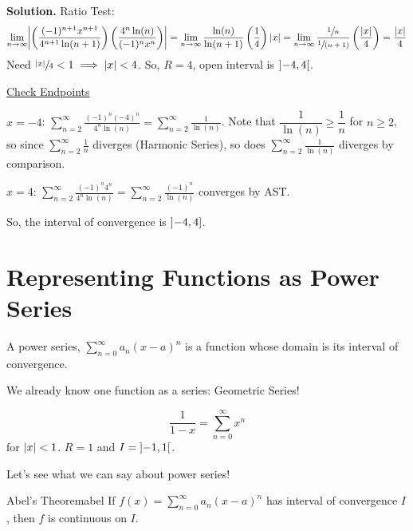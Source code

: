 \begin{Example}{}{}
\begin{enumerate}[label=(\roman*)]
              \textbf{Solution.} Ratio Test:
              \[ \lim\limits_{{n} \to {\infty}}
                  \abs*{\left( \frac{(-1)^{n+1}x^{n+1}}{4^{n+1}\ln(n+1)} \right)
                  \left( \frac{4^n\ln(n)}{(-1)^n x^n}  \right)}
                  =\lim\limits_{{n} \to {\infty}} \frac{\ln(n)}{\ln(n+1)} \left( \frac{1}{4} \right)
                  \abs{x}
                  =\lim\limits_{{n} \to {\infty}} \frac{\sfrac{1}{n}}{\sfrac{1}{(n+1)}}
                  \left( \frac{\abs{x}}{4} \right)
                  =\frac{\abs{x}}{4} \]
              Need $ \sfrac{\lvert x\rvert}{4}<1\implies \lvert x\rvert<4  $. So, $ R=4 $,
              open interval is $ \interval[open]{-4}{4} $.

              \underline{Check Endpoints}

              $ x=-4 $: $ \displaystyle \sum\limits_{n=2}^{\infty} \frac{(-1)^n(-4)^n}{4^n\ln(n)}
                  =\sum\limits_{n=2}^{\infty} \frac{1}{\ln(n)} $. Note that $ \dfrac{1}{\ln(n)}
                  \geqslant \dfrac{1}{n} $ for $ n\geqslant 2 $, so
              since $ \displaystyle \sum\limits_{n=2}^{\infty} \frac{1}{n} $ diverges (Harmonic Series), so does
              $ \displaystyle \sum\limits_{n=2}^{\infty} \frac{1}{\ln(n)} $ diverges by comparison.

              $ x=4 $: $ \displaystyle
                  \sum\limits_{n=2}^{\infty} \frac{(-1)^n4^n}{4^n\ln(n)}=\sum\limits_{n=2}^{\infty}
                  \frac{(-1)^n}{\ln(n)}  $ converges by AST\@.

              So, the interval of convergence is $ \interval[open left]{-4}{4} $.
    \end{enumerate}
\end{Example}

\section{Representing Functions as Power Series}
A power series, $ \sum\limits_{n=0}^{\infty} a_n(x-a)^n $ is a function whose domain is its
interval of convergence.

We already know one function as a series: Geometric Series!

\[ \boxed{\frac{1}{1-x}=\sum\limits_{n=0}^{\infty} x^n} \]
for $ \lvert x\rvert<1 $. $ R=1 $ and $ I=\interval[open]{-1}{1} $.

Let's see what we can say about power series!

\begin{Theorem}{Abel's Theorem}{abel}
    If $ f(x)=\sum\limits_{n=0}^{\infty} a_n(x-a)^n $ has interval of convergence
    $ I $, then $ f $ is continuous on $ I $.
\end{Theorem}

